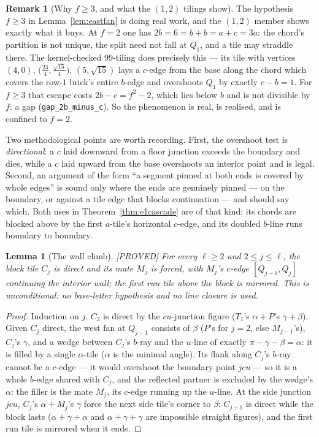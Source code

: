 \documentclass[11pt,reqno]{amsart}
\theoremstyle{plain}
\newtheorem{lemma}[theorem]{Lemma}
\theoremstyle{definition}
\newtheorem{remark}[theorem]{Remark}
\newcommand{\lab}[1]{\hfill\textnormal{\footnotesize\textsc{[#1]}}}
\begin{document}
\begin{remark}[Why $f\ge3$, and what the $(1,2)$ tilings show]\label{rem:whyf3}
The hypothesis $f\ge3$ in Lemma~\ref{lem:eastfan} is doing real work, and the $(1,2)$ member shows
exactly what it buys. At $f=2$ one has $2b=6=b+b=a+c=3a$: the chord's partition is not unique, the
split need not fall at $Q_1$, and a tile may straddle there. The kernel-checked $99$-tiling does
precisely this --- its tile with vertices $(4,0)$,
$\bigl(\tfrac{23}4,\tfrac{\sqrt{15}}4\bigr)$, $(5,\sqrt{15})$ lays a $c$-edge from the base along
the chord which covers the row-$1$ brick's entire $b$-edge and overshoots $Q_1$ by exactly
$c-b=1$. For $f\ge3$ that escape costs $2b-c=f^2-2$, which lies below $b$ and is not divisible by
$f$: a gap (\texttt{gap\_2b\_minus\_c}). So the phenomenon is real, is realised, and is confined
to $f=2$.

Two methodological points are worth recording. First, the overshoot test is \emph{directional}: a
$c$ laid downward from a floor junction exceeds the boundary and dies, while a $c$ laid upward
from the base overshoots an interior point and is legal. Second, an argument of the form ``a
segment pinned at both ends is covered by whole edges'' is sound only where the ends are genuinely
pinned --- on the boundary, or against a tile edge that blocks continuation --- and should say
which. Both uses in Theorem~\ref{thm:e1cascade} are of that kind: its chords are blocked above by
the first $a$-tile's horizontal $c$-edge, and its doubled $b$-line runs boundary to boundary.
\end{remark}

\begin{lemma}[The wall climb]\label{lem:wallclimb}\lab{PROVED}
For every $\ell\ge2$ and $2\le j\le\ell$, the block tile $C_j$ is direct and its mate $M_j$ is
forced, with $M_j$'s $c$-edge $[Q_{j-1},Q_j]$ continuing the interior wall; the first run tile
above the block is mirrored. This is unconditional: no base-letter hypothesis and no line
closure is used.
\end{lemma}
\begin{proof}
Induction on $j$. $C_2$ is direct by the $cu$-junction figure ($T_1$'s $\alpha+P$'s
$\gamma+\beta$). Given $C_j$ direct, the west fan at $Q_{j-1}$ consists of $\beta$ ($P$'s for
$j=2$, else $M_{j-1}$'s), $C_j$'s $\gamma$, and a wedge between $C_j$'s $b$-ray and the $u$-line
of exactly $\pi-\gamma-\beta=\alpha$: it is filled by a single $\alpha$-tile ($\alpha$ is the
minimal angle). Its flank along $C_j$'s $b$-ray cannot be a $c$-edge — it would overshoot the
boundary point $jcu$ — so it is a whole $b$-edge shared with $C_j$, and the reflected partner is
excluded by the wedge's $\alpha$: the filler is the mate $M_j$, its $c$-edge running up the
$u$-line. At the side junction $jcu$, $C_j$'s $\alpha+M_j$'s $\gamma$ force the next side
tile's corner to $\beta$: $C_{j+1}$ is direct while the block lasts ($\alpha+\gamma+\alpha$ and
$\alpha+\gamma+\gamma$ are impossible straight figures), and the first run tile is mirrored when
it ends.
\end{proof}
\end{document}
